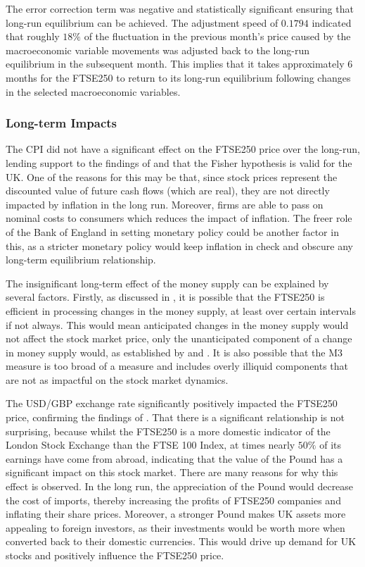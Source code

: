 \documentclass[11pt,a4paper]{article}
\newcommand{\citeboth}[1]{\citeauthor{#1} \citep{#1}}
\begin{document}
The error correction term 
was negative and statistically significant ensuring that long-run equilibrium 
can be achieved. The adjustment speed of $0.1794$ indicated that 
roughly $18\%$ of the fluctuation in the previous month's price caused by the 
macroeconomic variable movements was adjusted back to the long-run equilibrium in the subsequent month. This implies 
that it takes approximately 6 months for the FTSE250 to return to its long-run equilibrium following 
changes in the selected macroeconomic variables.

\subsubsection{Long-term Impacts}

The CPI did not have a significant effect on the FTSE250 price over the 
long-run, lending support to the findings of 
\citeboth{gultekin1983} and \citeboth{firth1979}
that the Fisher hypothesis is valid for the UK. One of the 
reasons for this may be that, since stock prices represent the 
discounted value of future cash flows (which are real), 
they are not directly impacted by inflation in the long run. Moreover, 
firms are able to pass on nominal costs to consumers which reduces
the impact of inflation.
The freer role of the Bank of England in setting monetary policy could be 
another factor in this, as a stricter monetary policy would keep inflation
in check and obscure any long-term equilibrium relationship. 

The insignificant long-term effect of the money supply can be explained by several factors.
Firstly, as discussed in \citeboth{sellin2001}, it is possible that the FTSE250 is efficient in processing changes in the 
money supply, at least over certain intervals if not always. This would mean anticipated changes in the money supply would not affect the stock market price, only the
unanticipated component of a change in money supply would, as established by \citeboth{sorensen1982} and \citeboth{bernanke2005}. 
It is also possible that the M3 measure is too broad of a measure and includes overly illiquid components that are not as impactful 
on the stock market dynamics. 

The USD/GBP exchange rate significantly positively impacted the FTSE250 price, confirming the findings of 
\citeboth{wong2022}. That there is a significant relationship is not surprising, because whilst the FTSE250 is a more domestic indicator of the London Stock Exchange than the FTSE 100 Index, 
at times nearly $50\%$ of its earnings have come from abroad, indicating that 
the value of the Pound has a significant impact on this stock market. There are many reasons for why this effect is observed.
In the long run, the appreciation of the Pound would decrease the 
cost of imports, thereby increasing the 
profits of FTSE250 companies and inflating their share prices.
Moreover, a stronger Pound makes UK assets more appealing to foreign investors, as their investments would be worth more when converted back to their domestic currencies.
This would drive up demand for UK stocks and positively influence the 
FTSE250 price.
\end{document}
